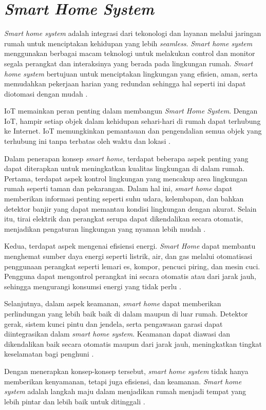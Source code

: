 \section{\textit{Smart Home System}}

\textit{Smart home system} adalah integrasi dari tekonologi dan layanan melalui jaringan rumah untuk menciptakan kehidupan yang lebih \textit{seamless}. \textit{Smart home system} menggunakan berbagai macam teknologi untuk melakukan control dan monitor segala perangkat dan interaksinya yang berada pada lingkungan rumah. \textit{Smart home system} bertujuan untuk menciptakan lingkungan yang efisien, aman, serta memudahkan pekerjaan harian yang redundan sehingga hal seperti ini dapat diotomasi dengan mudah \parencite{kadam2015smart}.

IoT memainkan peran penting dalam membangun \textit{Smart Home System}. Dengan IoT, hampir setiap objek dalam kehidupan sehari-hari di rumah dapat terhubung ke Internet. IoT memungkinkan pemantauan dan pengendalian semua objek yang terhubung ini tanpa terbatas oleh waktu dan lokasi \parencite{IoTSmartHome}.

Dalam penerapan konsep \textit{smart home}, terdapat beberapa aspek penting yang dapat diterapkan untuk meningkatkan kualitas lingkungan di dalam rumah. Pertama, terdapat aspek kontrol lingkungan yang mencakup area lingkungan rumah seperti taman dan pekarangan. Dalam hal ini, \textit{smart home} dapat memberikan informasi penting seperti suhu udara, kelembapan, dan bahkan detektor banjir yang dapat memantau kondisi lingkungan dengan akurat. Selain itu, tirai elektrik dan perangkat serupa dapat dikendalikan secara otomatis, menjadikan pengaturan lingkungan yang nyaman lebih mudah \parencite{PerancanganPrototypeSmartHome}.

Kedua, terdapat aspek mengenai efisiensi energi. \textit{Smart Home} dapat membantu menghemat sumber daya energi seperti listrik, air, dan gas melalui otomatisasi penggunaan perangkat seperti lemari es, kompor, pencuci piring, dan mesin cuci. Pengguna dapat mengontrol perangkat ini secara otomatis atau dari jarak jauh, sehingga mengurangi konsumsi energi yang tidak perlu \parencite{PerancanganPrototypeSmartHome}.

Selanjutnya, dalam aspek keamanan, \textit{smart home} dapat memberikan perlindungan yang lebih baik baik di dalam maupun di luar rumah. Detektor gerak, sistem kunci pintu dan jendela, serta pengawasan garasi dapat diintegrasikan dalam \textit{smart home system}. Keamanan dapat diawasi dan dikendalikan baik secara otomatis maupun dari jarak jauh, meningkatkan tingkat keselamatan bagi penghuni \parencite{PerancanganPrototypeSmartHome}.

Dengan menerapkan konsep-konsep tersebut, \textit{smart home system} tidak hanya memberikan kenyamanan, tetapi juga efisiensi, dan keamanan. \textit{Smart home system} adalah langkah maju dalam menjadikan rumah menjadi tempat yang lebih pintar dan lebih baik untuk ditinggali \parencite{PerancanganPrototypeSmartHome}.